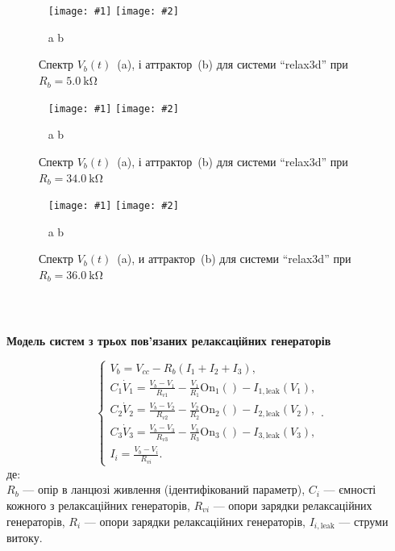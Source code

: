 \documentclass[14pt,handout,utf8]{beamer}
\newcommand{\Xhead}[1]{
 \begin{center}%
      \textbf{#1}%
 \end{center}%
}
\newcommand{\ABlbl}{%
  \vspace{-2.7ex}
  \begin{center}
    ~ \hfill a \hfill\hfill b \hfill ~
  \end{center}
  \vspace{-2.0ex}
}
\newcommand{\PicDoubleS}[2]{%
 \begin{center}
    ~ \hfill
    \texttt{[image: \#1]}
    \hfill
    \texttt{[image: \#2]}
    \hfill ~
  \end{center}
  \ABlbl
}
\begin{document}
\begin{frame}
  \frametitle{~}

  \Xhead{}

  \begin{figure}
    \PicDoubleS{../p7/p/relax3d_f_02.png}{../p7/p/relax3d_v1v2v3_02.png}
    \caption{Спектр $V_b(t)$~(a), і аттрактор~(b) для системи ``relax3d'' при $R_b = \SI{5.0}{\kilo \ohm} $}
    \label{atu:f:relax3d_f_02}
  \end{figure}

  \begin{figure}
    \PicDoubleS{../p7/p/relax3d_f_08.png}{../p7/p/relax3d_v1v2v3_08.png}
    \caption{Спектр $V_b(t)$~(a), і аттрактор~(b) для системи ``relax3d'' при $ R_b = \SI{34.0}{\kilo\ohm} $}
    \label{atu:f:relax3d_f_08}
  \end{figure}

  \begin{figure}
    \PicDoubleS{../p7/p/relax3d_f_09.png}{../p7/p/relax3d_v1v2v3_09.png}
    \caption{Спектр $V_b(t)$~(a), и аттрактор~(b) для системи ``relax3d'' при $R_b=\SI{36.0}{\kilo\ohm}$ }
    \label{atu:f:relax3d_f_09}
  \end{figure}

\end{frame}



\begin{frame}
  \frametitle{~}

  \Xhead{Модель систем з трьох пов'язаних релаксаційних генераторів}

  \begin{equation}
  \begin{cases}
    V_b = V_{cc} - R_b ( I_1 + I_2 + I_3 ), \\
      C_1 \dot{V}_1 = \frac{V_b-V_1}{R_{v1}} - \frac{V_1}{R_1} \mathrm{On}_1() - I_{1,\mathrm{leak}}(V_1), \\
      C_2 \dot{V}_2 = \frac{V_b-V_2}{R_{v2}} - \frac{V_2}{R_2} \mathrm{On}_2() - I_{2,\mathrm{leak}}(V_2), \\
      C_3 \dot{V}_3 = \frac{V_b-V_3}{R_{v3}} - \frac{V_3}{R_3} \mathrm{On}_3() - I_{3,\mathrm{leak}}(V_3), \\
      I_i = \frac{V_b-V_i}{R_{vi}}.
  \end{cases}.
    \label{atu:eq:relax3}
\end{equation}
%
де: \\
$R_b $ --- опір в ланцюзі живлення (ідентифікований параметр),
$C_i $ --- ємності кожного з релаксаційних генераторів,
$R_{vi} $ --- опори зарядки релаксаційних генераторів,
$R_{ i} $ --- опори зарядки релаксаційних генераторів,
$I_{i, \mathrm{leak}} $ --- струми витоку.


\end{frame}
\end{document}
